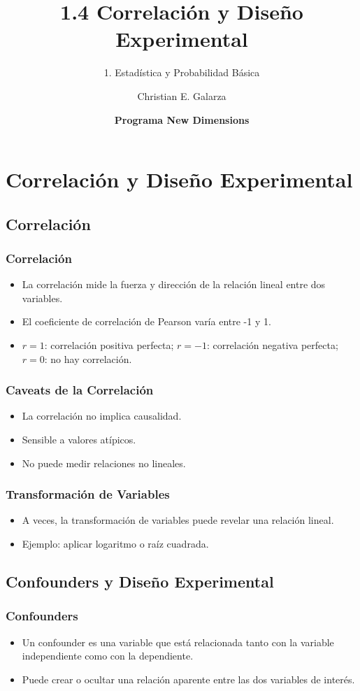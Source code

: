 \documentclass[aspectratio=169]{beamer}
\title[1.4. Correlación y Diseño Experimental]{\Huge 1.4 Correlación y Diseño Experimental}
\subtitle{1. Estadística y Probabilidad Básica}
\author{Christian E. Galarza}
\date{\bf Programa New Dimensions}
\begin{document}
\frame{\titlepage}

\section{Correlación y Diseño Experimental}

\subsection{Correlación}
\begin{frame}
\frametitle{Correlación}
\begin{itemize}
    \item La correlación mide la fuerza y dirección de la relación lineal entre dos variables.
    \item El coeficiente de correlación de Pearson varía entre -1 y 1.
    \item \( r = 1 \): correlación positiva perfecta; \( r = -1 \): correlación negativa perfecta; \( r = 0 \): no hay correlación.
\end{itemize}
\end{frame}

\begin{frame}
\frametitle{Caveats de la Correlación}
\begin{itemize}
    \item La correlación no implica causalidad.
    \item Sensible a valores atípicos.
    \item No puede medir relaciones no lineales.
\end{itemize}
\end{frame}

\begin{frame}
\frametitle{Transformación de Variables}
\begin{itemize}
    \item A veces, la transformación de variables puede revelar una relación lineal.
    \item Ejemplo: aplicar logaritmo o raíz cuadrada.
\end{itemize}
\end{frame}

\subsection{Confounders y Diseño Experimental}
\begin{frame}
\frametitle{Confounders}
\begin{itemize}
    \item Un confounder es una variable que está relacionada tanto con la variable independiente como con la dependiente.
    \item Puede crear o ocultar una relación aparente entre las dos variables de interés.
\end{itemize}
\end{frame}
\end{document}
